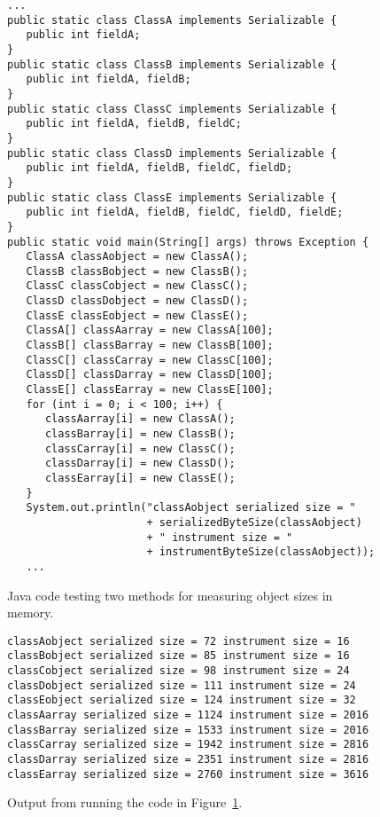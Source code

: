 \begin{figure}
\begin{verbatim}
...
public static class ClassA implements Serializable {
   public int fieldA;
}
public static class ClassB implements Serializable {
   public int fieldA, fieldB;
}
public static class ClassC implements Serializable {
   public int fieldA, fieldB, fieldC;
}
public static class ClassD implements Serializable {
   public int fieldA, fieldB, fieldC, fieldD;
}
public static class ClassE implements Serializable {
   public int fieldA, fieldB, fieldC, fieldD, fieldE;
}
public static void main(String[] args) throws Exception {
   ClassA classAobject = new ClassA();
   ClassB classBobject = new ClassB();
   ClassC classCobject = new ClassC();
   ClassD classDobject = new ClassD();
   ClassE classEobject = new ClassE();
   ClassA[] classAarray = new ClassA[100];
   ClassB[] classBarray = new ClassB[100];
   ClassC[] classCarray = new ClassC[100];
   ClassD[] classDarray = new ClassD[100];
   ClassE[] classEarray = new ClassE[100];
   for (int i = 0; i < 100; i++) {
      classAarray[i] = new ClassA();
      classBarray[i] = new ClassB();
      classCarray[i] = new ClassC();
      classDarray[i] = new ClassD();
      classEarray[i] = new ClassE();
   }
   System.out.println("classAobject serialized size = "
                      + serializedByteSize(classAobject)
                      + " instrument size = "
                      + instrumentByteSize(classAobject));
   ...
\end{verbatim}
\caption{Java code testing two methods for measuring object sizes in memory.}
\label{fig:javacode}
\end{figure}

\begin{figure}
\begin{verbatim}
classAobject serialized size = 72 instrument size = 16
classBobject serialized size = 85 instrument size = 16
classCobject serialized size = 98 instrument size = 24
classDobject serialized size = 111 instrument size = 24
classEobject serialized size = 124 instrument size = 32
classAarray serialized size = 1124 instrument size = 2016
classBarray serialized size = 1533 instrument size = 2016
classCarray serialized size = 1942 instrument size = 2816
classDarray serialized size = 2351 instrument size = 2816
classEarray serialized size = 2760 instrument size = 3616
\end{verbatim}
\caption{Output from running the code in Figure~\ref{fig:javacode}.}
\label{fig:javaoutput}
\end{figure}

